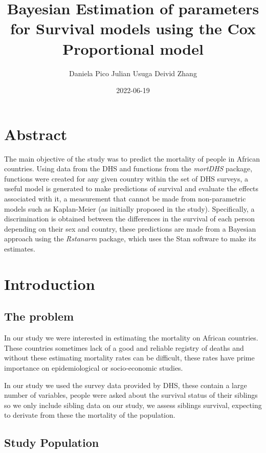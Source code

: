 \documentclass[
  twocolumn]{article}
\title{Bayesian Estimation of parameters for Survival models using the
Cox Proportional model}
\author{Daniela Pico Julian Usuga Deivid Zhang}
\date{2022-06-19}
\begin{document}
\maketitle

\hypertarget{abstract}{%
\section{Abstract}\label{abstract}}

The main objective of the study was to predict the mortality of people
in African countries. Using data from the DHS and functions from the
\emph{mortDHS} package, functions were created for any given country
within the set of DHS surveys, a useful model is generated to make
predictions of survival and evaluate the effects associated with it, a
measurement that cannot be made from non-parametric models such as
Kaplan-Meier (as initially proposed in the study). Specifically, a
discrimination is obtained between the differences in the survival of
each person depending on their sex and country, these predictions are
made from a Bayesian approach using the \emph{Rstanarm} package, which
uses the Stan software to make its estimates.

\hypertarget{introduction}{%
\section{Introduction}\label{introduction}}

\hypertarget{the-problem}{%
\subsection{The problem}\label{the-problem}}

In our study we were interested in estimating the mortality on African
countries. These countries sometimes lack of a good and reliable
registry of deaths and without these estimating mortality rates can be
difficult, these rates have prime importance on epidemiological or
socio-economic studies.

In our study we used the survey data provided by DHS, these contain a
large number of variables, people were asked about the survival status
of their siblings so we only include sibling data on our study, we
assess siblings survival, expecting to derivate from these the mortality
of the population.

\hypertarget{study-population}{%
\subsection{Study Population}\label{study-population}}
\end{document}
